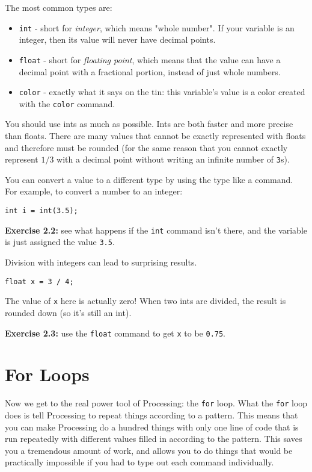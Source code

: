 \documentclass[
]{leaflet}
\begin{document}
The most common types are:
\begin{itemize}
  \item \texttt{int} - short for \textit{integer}, which means "whole number".
    If your variable is an integer, then its value will never have decimal points.

  \item \texttt{float} - short for \textit{floating point}, which means that the value can have a decimal point with a fractional portion, instead of just whole numbers.

  \item \texttt{color} - exactly what it says on the tin: this variable's value is a color created with the \texttt{color} command.
\end{itemize}

You should use ints as much as possible.
Ints are both faster and more precise than floats.
There are many values that cannot be exactly represented with floats and therefore must be rounded (for the same reason that you cannot exactly represent $1/3$ with a decimal point without writing an infinite number of \texttt{3}s).

You can convert a value to a different type by using the type like a command.
For example, to convert a number to an integer:
\begin{lstlisting}
int i = int(3.5);
\end{lstlisting}

\textbf{Exercise 2.2:} see what happens if the \texttt{int} command isn't there, and the variable is just assigned the value \texttt{3.5}.

Division with integers can lead to surprising results.
\begin{lstlisting}
float x = 3 / 4;
\end{lstlisting}
\vspace{-0.5em}
The value of \texttt{x} here is actually zero!
When two ints are divided, the result is rounded down (so it's still an int).

\textbf{Exercise 2.3:} use the \texttt{float} command to get \texttt{x} to be \texttt{0.75}.
\vspace{-1.5em}

\section{For Loops}

Now we get to the real power tool of Processing: the \texttt{for} loop.
What the \texttt{for} loop does is tell Processing to repeat things according to a pattern.
This means that you can make Processing do a hundred things with only one line of code that is run repeatedly with different values filled in according to the pattern.
This saves you a tremendous amount of work, and allows you to do things that would be practically impossible if you had to type out each command individually.
\end{document}
